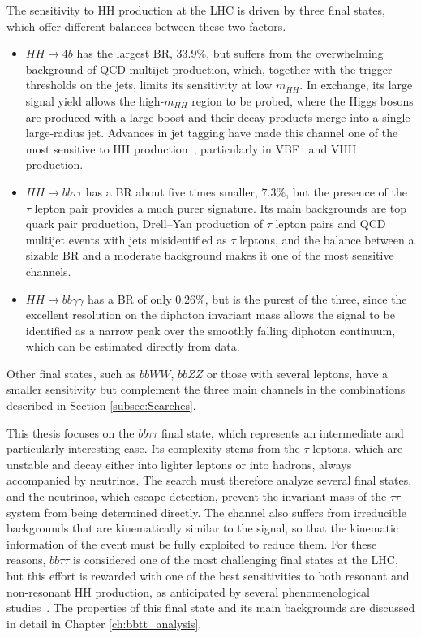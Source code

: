 The sensitivity to HH production at the LHC is driven by three final states, which offer different balances between these two factors.
\begin{itemize}
    \item $HH\to 4b$ has the largest BR, $33.9\%$, but suffers from the overwhelming background of QCD multijet production, which, together with the trigger thresholds on the jets, limits its sensitivity at low $m_{HH}$. In exchange, its large signal yield allows the high-$m_{HH}$ region to be probed, where the Higgs bosons are produced with a large boost and their decay products merge into a single large-radius jet. Advances in jet tagging have made this channel one of the most sensitive to HH production~\cite{CMS:2022bbbb,ATLAS:2023bbbb,CMS:2023boosted4b}, particularly in VBF~\cite{ATLAS:2024VBFbbbb} and VHH~\cite{ATLAS:2023VHH} production.
    \item $HH\to bb\tau\tau$ has a BR about five times smaller, $7.3\%$, but the presence of the $\tau$ lepton pair provides a much purer signature. Its main backgrounds are top quark pair production, Drell–Yan production of $\tau$ lepton pairs and QCD multijet events with jets misidentified as $\tau$ leptons, and the balance between a sizable BR and a moderate background makes it one of the most sensitive channels.
    \item $HH\to bb\gamma\gamma$ has a BR of only $0.26\%$, but is the purest of the three, since the excellent resolution on the diphoton invariant mass allows the signal to be identified as a narrow peak over the smoothly falling diphoton continuum, which can be estimated directly from data.
\end{itemize}
Other final states, such as $bbWW$, $bbZZ$ or those with several leptons, have a smaller sensitivity but complement the three main channels in the combinations described in Section \ref{subsec:Searches}.\bigskip

\noindent This thesis focuses on the $bb\tau\tau$ final state, which represents an intermediate and particularly interesting case. Its complexity stems from the $\tau$ leptons, which are unstable and decay either into lighter leptons or into hadrons, always accompanied by neutrinos. The search must therefore analyze several final states, and the neutrinos, which escape detection, prevent the invariant mass of the $\tau\tau$ system from being determined directly. The channel also suffers from irreducible backgrounds that are kinematically similar to the signal, so that the kinematic information of the event must be fully exploited to reduce them. For these reasons, $bb\tau\tau$ is considered one of the most challenging final states at the LHC, but this effort is rewarded with one of the best sensitivities to both resonant and non-resonant HH production, as anticipated by several phenomenological studies~\cite{Baglio:2012np,Dolan:2012rv,Barr:2013tda}. The properties of this final state and its main backgrounds are discussed in detail in Chapter \ref{ch:bbtt_analysis}.


